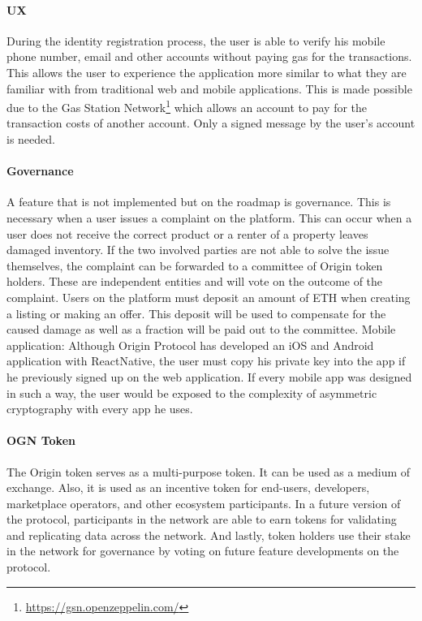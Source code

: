 \paragraph{UX}
During the identity registration process, the user is able to verify his mobile phone number, email and other accounts without paying gas for the transactions. This allows the user to experience the application more similar to what they are familiar with from traditional web and mobile applications. This is made possible due to the Gas Station Network\footnote{\href{https://gsn.openzeppelin.com/}{https://gsn.openzeppelin.com/}} which allows an account to pay for the transaction costs of another account. Only a signed message by the user's account is needed. 

\paragraph{Governance}
A feature that is not implemented but on the roadmap is governance. This is necessary when a user issues a complaint on the platform. This can occur when a user does not receive the correct product or a renter of a property leaves damaged inventory. If the two involved parties are not able to solve the issue themselves, the complaint can be forwarded to a committee of Origin token holders. These are independent entities and will vote on the outcome of the complaint. Users on the platform must deposit an amount of ETH when creating a listing or making an offer. This deposit will be used to compensate for the caused damage as well as a fraction will be paid out to the committee.
Mobile application: Although Origin Protocol has developed an iOS and Android application with ReactNative, the user must copy his private key into the app if he previously signed up on the web application. If every mobile app was designed in such a way, the user would be exposed to the complexity of asymmetric cryptography with every app he uses.

\paragraph{OGN Token} The Origin token serves as a multi-purpose token. It can be used as a medium of exchange. Also, it is used as an incentive token for end-users, developers, marketplace operators, and other ecosystem participants. In a future version of the protocol, participants in the network are able to earn tokens for validating and replicating data across the network. And lastly, token holders use their stake in the network for governance by voting on future feature developments on the protocol. 

